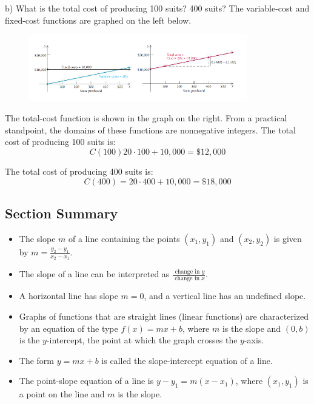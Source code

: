 \documentclass{report}
\begin{document}
\noindent b) What is the total cost of producing 100 suits? 400 suits?
\bigbreak \noindent
\sol{}
\bigbreak \noindent
The variable-cost and fixed-cost functions are graphed on the left below.
\begin{figure}[ht]
\centering
\includegraphics[width=0.85\textwidth]{ marcus.png }
\end{figure}
\bigbreak \noindent
The total-cost function is shown in the graph on the right. From a practical standpoint, the domains of these functions are nonnegative integers.
\bigbreak \noindent
{} The total cost of producing 100 suits is:
$$ C(100) 20 \cdot 100 + 10,000 = \$12,000$$
\vspace{2mm}

\noindent
The total cost of producing 400 suits is:
$$C(400) = 20 \cdot 400 + 10,000 = \$18,000$$
\bigbreak \noindent \bigbreak \noindent
\subsection{Section Summary}
\begin{minipage}{0.45\textwidth}
  \begin{itemize}
    \item The slope $m$ of a line containing the points $\left(x_1, y_1\right)$ and $\left(x_2, y_2\right)$ is given by $m=\frac{y_2-y_1}{x_2-x_1}$.
    \item  The slope of a line can be interpreted as $\frac{\text { change in } y}{\text { change in } x}$.
    \item A horizontal line has slope $m=0$, and a vertical line has an undefined slope.
  \end{itemize}
\end{minipage}
\begin{minipage}{0.45\textwidth}
  \begin{itemize}
    \item Graphs of functions that are straight lines (linear functions) are characterized by an equation of the type $f(x)=m x+b$, where $m$ is the slope and $(0, b)$ is the $y$-intercept, the point at which the graph crosses the $y$-axis.
    \item The form $y=m x+b$ is called the slope-intercept equation of a line.
    \item The point-slope equation of a line is $y-y_1=m\left(x-x_1\right)$, where $\left(x_1, y_1\right)$ is a point on the line and $m$ is the slope.
\end{itemize}
\end{minipage}
\pagebreak
\end{document}
